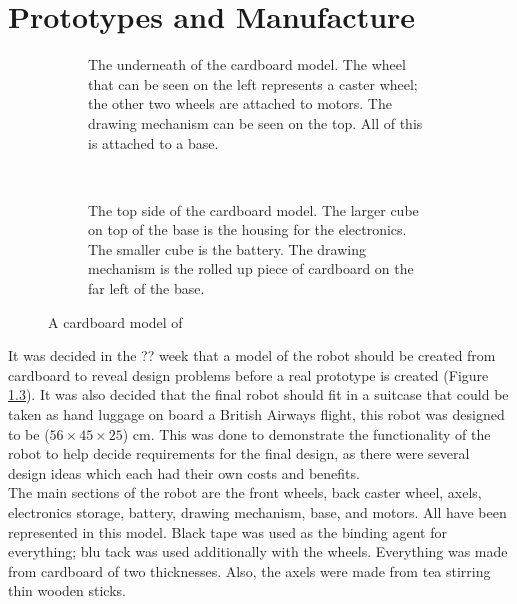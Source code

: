 \chapter{Prototypes and Manufacture}\label{prototypes}\label{section \thechapter}

    \begin{figure}[bh]%
        \centering
        \begin{subfigure}[b]{0.45\textwidth}
            \caption{The underneath of the cardboard model. The wheel that can be seen on the left represents a caster wheel; the other two wheels are attached to motors. The drawing mechanism can be seen on the top. All of this is attached to a base.}
            \label{fig:cardboard model 1}
        \end{subfigure}
        ~
        \begin{subfigure}[b]{0.45\textwidth}
            \caption{The top side of the cardboard model. The larger cube on top of the base is the housing for the electronics. The smaller cube is the battery. The drawing mechanism is the rolled up piece of cardboard on the far left of the base.}
            \label{fig:cardboard model 2}
        \end{subfigure}
        \caption{A cardboard model of \SandE}
        \label{fig:cardboard model}
    \end{figure}
    It was decided in the ?? week that a model of the robot should be created from cardboard to reveal design problems before a real prototype is created (Figure \ref{fig:cardboard model}). It was also decided that the final robot should fit in a suitcase that could be taken as hand luggage on board a British Airways flight, this robot was designed to be ($56 \times 45 \times 25$) cm. This was done to demonstrate the functionality of the robot to help decide requirements for the final design, as there were several design ideas which each had their own costs and benefits.\\
    The main sections of the robot are the front wheels, back caster wheel, axels, electronics storage, battery, drawing mechanism, base, and motors. All have been represented in this model. Black tape was used as the binding agent for everything; blu tack was used additionally with the wheels. Everything was made from cardboard of two thicknesses. Also, the axels were made from tea stirring thin wooden sticks.


